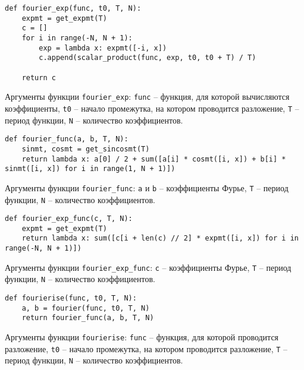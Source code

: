 \begin{lstlisting}[style=python_white, caption=Функция для вычисления коэффициентов Фурье, label=lst:fourier_exp]
def fourier_exp(func, t0, T, N):
    expmt = get_expmt(T)
    c = []
    for i in range(-N, N + 1):
        exp = lambda x: expmt([-i, x])
        c.append(scalar_product(func, exp, t0, t0 + T) / T)

    return c
\end{lstlisting}
Аргументы функции \texttt{fourier\_exp}: \texttt{func} -- функция, для которой вычисляются коэффициенты, \texttt{t0} -- начало промежутка, на котором проводится разложение, \texttt{T} -- период функции, \texttt{N} -- количество коэффициентов.
\newline

\begin{lstlisting}[style=python_white, caption=Получение функции частичной суммы рядя Фурье до $N$, label=lst:fourier_func]
def fourier_func(a, b, T, N):
    sinmt, cosmt = get_sincosmt(T)
    return lambda x: a[0] / 2 + sum([a[i] * cosmt([i, x]) + b[i] * sinmt([i, x]) for i in range(1, N + 1)])
\end{lstlisting}
Аргументы функции \texttt{fourier\_func}: \texttt{a} и \texttt{b} -- коэффициенты Фурье, \texttt{T} -- период функции, \texttt{N} -- количество коэффициентов.
\newline

\begin{lstlisting}[style=python_white, caption=Получение функции частичной суммы рядя Фурье до $N$, label=lst:fourier_func_exp]
def fourier_exp_func(c, T, N):
    expmt = get_expmt(T)
    return lambda x: sum([c[i + len(c) // 2] * expmt([i, x]) for i in range(-N, N + 1)])
\end{lstlisting}
Аргументы функции \texttt{fourier\_exp\_func}: \texttt{c} -- коэффициенты Фурье, \texttt{T} -- период функции, \texttt{N} -- количество коэффициентов.
\newline
    
\begin{lstlisting}[style=python_white, caption=Функция для получения разложения Фурье функции, label=lst:fourierise]
def fourierise(func, t0, T, N):
    a, b = fourier(func, t0, T, N)
    return fourier_func(a, b, T, N)
\end{lstlisting}
Аргументы функции \texttt{fourierise}: \texttt{func} -- функция, для которой проводится разложение, \texttt{t0} -- начало промежутка, на котором проводится разложение, \texttt{T} -- период функции, \texttt{N} -- количество коэффициентов.
\newline

